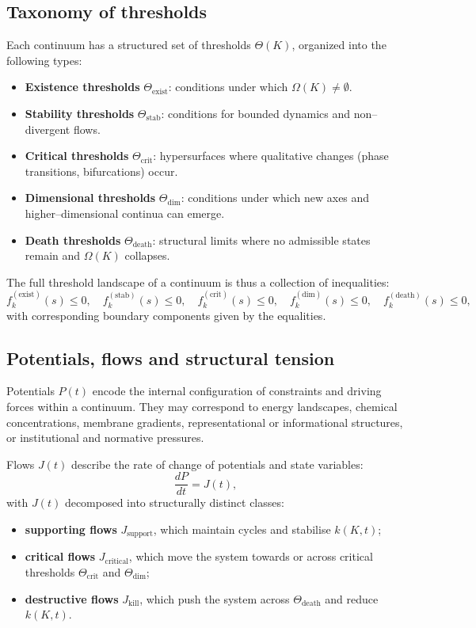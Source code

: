 \subsection{Taxonomy of thresholds}

Each continuum has a structured set of thresholds \(\Theta(K)\), organized into the following types:

\begin{itemize}
    \item \textbf{Existence thresholds} \(\Theta_{\mathrm{exist}}\): conditions under which \(\Omega(K)\neq\emptyset\).
    \item \textbf{Stability thresholds} \(\Theta_{\mathrm{stab}}\): conditions for bounded dynamics and non–divergent flows.
    \item \textbf{Critical thresholds} \(\Theta_{\mathrm{crit}}\): hypersurfaces where qualitative changes (phase transitions, bifurcations) occur.
    \item \textbf{Dimensional thresholds} \(\Theta_{\mathrm{dim}}\): conditions under which new axes and higher–dimensional continua can emerge.
    \item \textbf{Death thresholds} \(\Theta_{\mathrm{death}}\): structural limits where no admissible states remain and \(\Omega(K)\) collapses.
\end{itemize}

The full threshold landscape of a continuum is thus a collection of inequalities:
\[
    f_{k}^{(\mathrm{exist})}(s) \le 0,\quad
    f_{k}^{(\mathrm{stab})}(s) \le 0,\quad
    f_{k}^{(\mathrm{crit})}(s) \le 0,\quad
    f_{k}^{(\mathrm{dim})}(s) \le 0,\quad
    f_{k}^{(\mathrm{death})}(s) \le 0,
\]
with corresponding boundary components given by the equalities.

\subsection{Potentials, flows and structural tension}

Potentials \(P(t)\) encode the internal configuration of constraints and driving forces within a continuum.
They may correspond to energy landscapes, chemical concentrations, membrane gradients, representational or informational structures, or institutional and normative pressures.

Flows \(J(t)\) describe the rate of change of potentials and state variables:
\[
    \frac{dP}{dt} = J(t),
\]
with \(J(t)\) decomposed into structurally distinct classes:
\begin{itemize}
    \item \textbf{supporting flows} \(J_{\mathrm{support}}\), which maintain cycles and stabilise \(k(K,t)\);
    \item \textbf{critical flows} \(J_{\mathrm{critical}}\), which move the system towards or across critical thresholds \(\Theta_{\mathrm{crit}}\) and \(\Theta_{\mathrm{dim}}\);
    \item \textbf{destructive flows} \(J_{\mathrm{kill}}\), which push the system across \(\Theta_{\mathrm{death}}\) and reduce \(k(K,t)\).
\end{itemize}

